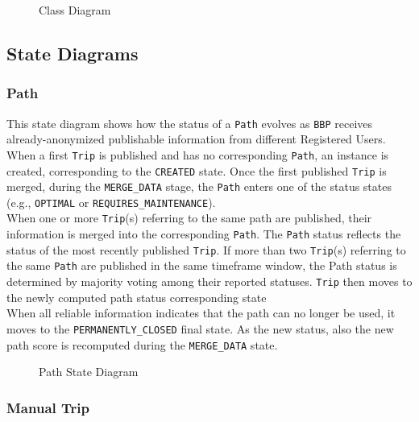 \begin{figure}[H]
    \centering
    
    \caption{Class Diagram}
    \label{fig:class_diagram}
\end{figure}

\subsection{State Diagrams}
\label{sec:state_diagrams}

\subsubsection{Path}

This state diagram shows how the status of a \texttt{Path} evolves as \texttt{BBP} receives already-anonymized publishable information from different Registered Users. When a first \texttt{Trip} is published and has no corresponding \texttt{Path}, an instance is created, corresponding to the \texttt{CREATED} state. Once the first published \texttt{Trip} is merged, during the \texttt{MERGE\_DATA} stage, the \texttt{Path} enters one of the status states (e.g., \texttt{OPTIMAL} or \texttt{REQUIRES\_MAINTENANCE}).\\
When one or more \texttt{Trip}(s) referring to the same path are published, their information is merged into the corresponding \texttt{Path}. The \texttt{Path} status reflects the status of the most recently published \texttt{Trip}. If more than two \texttt{Trip}(s) referring to the same \texttt{Path} are published in the same timeframe window, the Path status is determined by majority voting among their reported statuses. 
\texttt{Trip} then moves to the newly computed path status corresponding state \\
When all reliable information indicates that the path can no longer be used, it moves to the \texttt{PERMANENTLY\_CLOSED} final state. As the new status, also the new path score is recomputed during the \texttt{MERGE\_DATA} state.

\begin{figure}[H]
    \centering
    
    \caption{Path State Diagram}
    \label{fig:path_state}
\end{figure}

\subsubsection{Manual Trip}

